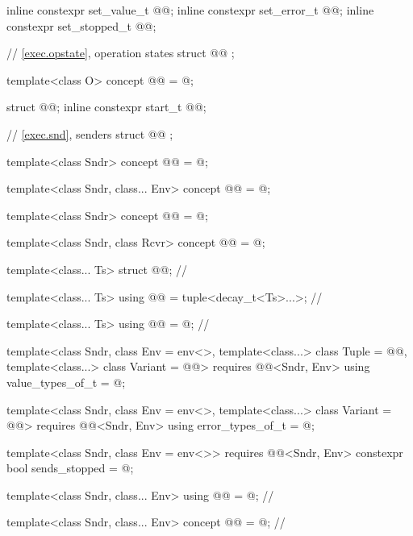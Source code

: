 \begin{codeblock}
{  inline constexpr set_value_t @@{};
  inline constexpr set_error_t @@{};
  inline constexpr set_stopped_t @@{};

  // \ref{exec.opstate}, operation states
  struct @@ {};

  template<class O>
    concept @@ = @\seebelow@;

  struct @@;
  inline constexpr start_t @@{};

  // \ref{exec.snd}, senders
  struct @@ {};

  template<class Sndr>
    concept @@ = @\seebelow@;

  template<class Sndr, class... Env>
    concept @@ = @\seebelow@;

  template<class Sndr>
    concept @@ = @\seebelow@;

  template<class Sndr, class Rcvr>
    concept @@ = @\seebelow@;

  template<class... Ts>
    struct @@;                                           // \expos

  template<class... Ts>
    using @@ = tuple<decay_t<Ts>...>;                // \expos

  template<class... Ts>
    using @@ = @\seebelownc@;                         // \expos

  template<class Sndr, class Env = env<>,
           template<class...> class Tuple = @@,
           template<class...> class Variant = @@>
      requires @@<Sndr, Env>
    using value_types_of_t = @\seebelow@;

  template<class Sndr, class Env = env<>,
           template<class...> class Variant = @@>
      requires @@<Sndr, Env>
    using error_types_of_t = @\seebelow@;

  template<class Sndr, class Env = env<>>
      requires @@<Sndr, Env>
    constexpr bool sends_stopped = @\seebelow@;

  template<class Sndr, class... Env>
    using @@ = @\seebelownc@;                 // \expos

  template<class Sndr, class... Env>
    concept @@ = @\seebelow@; // \expos

}
\end{codeblock}
